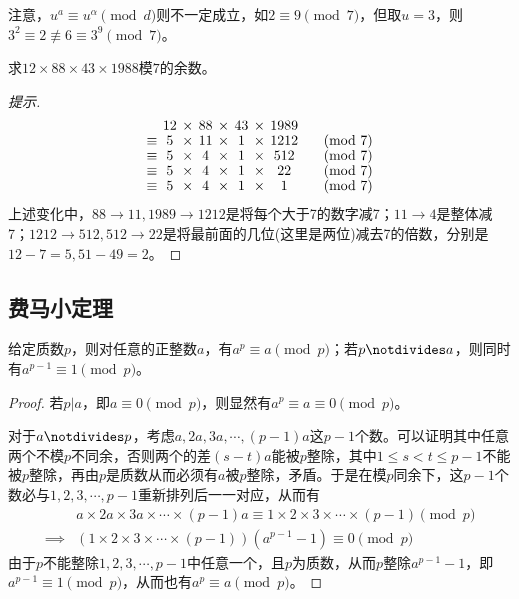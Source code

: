 
注意，$u^a\equiv u^{\alpha}\pmod d$则不一定成立，如$2\equiv9\pmod7$，但取$u=3$，则$3^2\equiv2\not\equiv6\equiv 3^9\pmod7$。

\begin{question}
  求$12\times88\times43\times1988$模$7$的余数。
\end{question}
\begin{proof}[提示]
  \begin{align*}\renewcommand{\arraystretch}{.9}\setlength\arraycolsep{2pt}
    \begin{array}{ccccccccl}
             & 12 & \times & 88 & \times & 43 & \times & 1989 &\\
      \equiv & 5  & \times & 11 & \times & 1  & \times & 1212 &\quad\pmod7\\
      \equiv & 5  & \times & 4  & \times & 1  & \times & 512  &\quad\pmod7\\
      \equiv & 5  & \times & 4  & \times & 1  & \times & 22   &\quad\pmod7\\
      \equiv & 5  & \times & 4  & \times & 1  & \times & 1    &\quad\pmod7
    \end{array}
  \end{align*}
  上述变化中，$88\to 11, 1989\to1212$是将每个大于7的数字减7；$11\to4$是整体减7；$1212\to512,512\to22$是将最前面的几位(这里是两位)减去7的倍数，分别是$12-7=5, 51-49=2$。
\end{proof}

\subsection{费马小定理}
\label{sec:Fermat-theorem}

\begin{theorem}
  给定质数$p$，则对任意的正整数$a$，有$a^p\equiv a\pmod p$；若$p\notdivides a$，则同时有$a^{p-1}\equiv1\pmod p$。
\end{theorem}
\begin{proof}
  若$p|a$，即$a\equiv0\pmod p$，则显然有$a^p\equiv a\equiv0\pmod p$。

  对于$a\notdivides p$，考虑$a,2a,3a,\cdots,(p-1)a$这$p-1$个数。可以证明其中任意两个不模$p$不同余，否则两个的差$(s-t)a$能被$p$整除，其中$1\le s<t\le p-1$不能被$p$整除，再由$p$是质数从而必须有$a$被$p$整除，矛盾。于是在模$p$同余下，这$p-1$个数必与$1,2,3,\cdots,p-1$重新排列后一一对应，从而有
  \begin{align*}
    & a \times 2a \times 3a \times \cdots \times (p-1)a
    \equiv 1 \times 2 \times 3 \times \cdots \times (p-1) \pmod p\\
    \implies & (1\times 2\times 3\times\cdots\times (p-1))(a^{p-1}-1)\equiv0\pmod p
  \end{align*}
  由于$p$不能整除$1,2,3,\cdots,p-1$中任意一个，且$p$为质数，从而$p$整除$a^{p-1}-1$，即$a^{p-1}\equiv1\pmod p$，从而也有$a^p\equiv a\pmod p$。
\end{proof}

